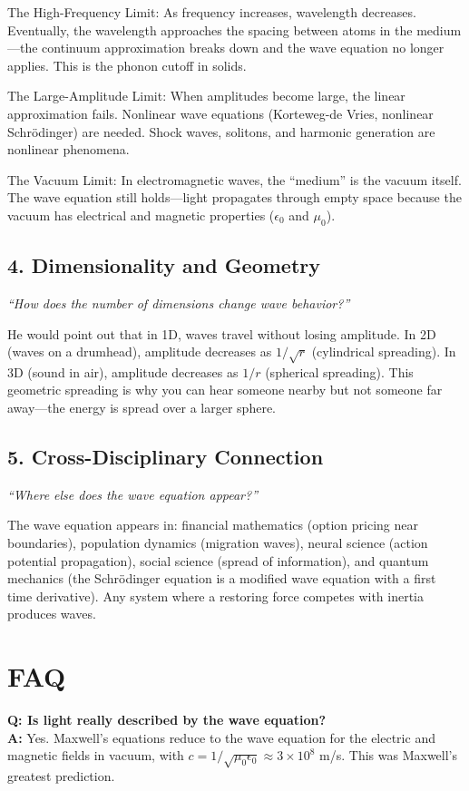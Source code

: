 \documentclass[11pt,openright]{book}
\begin{document}
The High-Frequency Limit: As frequency increases, wavelength decreases. Eventually, the wavelength approaches the spacing between atoms in the medium---the continuum approximation breaks down and the wave equation no longer applies. This is the phonon cutoff in solids.

The Large-Amplitude Limit: When amplitudes become large, the linear approximation fails. Nonlinear wave equations (Korteweg-de Vries, nonlinear Schr\"odinger) are needed. Shock waves, solitons, and harmonic generation are nonlinear phenomena.

The Vacuum Limit: In electromagnetic waves, the ``medium'' is the vacuum itself. The wave equation still holds---light propagates through empty space because the vacuum has electrical and magnetic properties ($\epsilon_0$ and $\mu_0$).

\subsection*{4. Dimensionality and Geometry}
\textit{``How does the number of dimensions change wave behavior?''}

He would point out that in 1D, waves travel without losing amplitude. In 2D (waves on a drumhead), amplitude decreases as $1/\sqrt{r}$ (cylindrical spreading). In 3D (sound in air), amplitude decreases as $1/r$ (spherical spreading). This geometric spreading is why you can hear someone nearby but not someone far away---the energy is spread over a larger sphere.

\subsection*{5. Cross-Disciplinary Connection}
\textit{``Where else does the wave equation appear?''}

The wave equation appears in: financial mathematics (option pricing near boundaries), population dynamics (migration waves), neural science (action potential propagation), social science (spread of information), and quantum mechanics (the Schr\"odinger equation is a modified wave equation with a first time derivative). Any system where a restoring force competes with inertia produces waves.
\section*{FAQ}

\textbf{Q: Is light really described by the wave equation?}\\
\textbf{A:} Yes. Maxwell's equations reduce to the wave equation for the electric and magnetic fields in vacuum, with $c = 1/\sqrt{\mu_0 \epsilon_0} \approx 3 \times 10^8$ m/s. This was Maxwell's greatest prediction.
\end{document}
